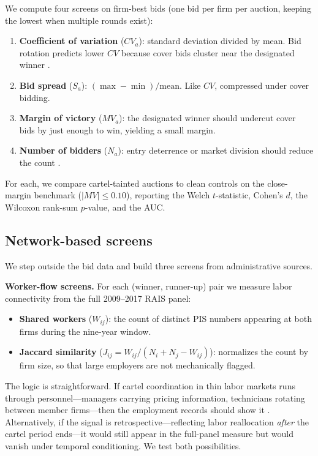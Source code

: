 We compute four screens on firm-best bids (one bid per firm per auction, keeping the lowest when multiple rounds exist):

\begin{enumerate}
\item \textbf{Coefficient of variation} ($CV_a$): standard deviation divided by mean. Bid rotation predicts lower $CV$ because cover bids cluster near the designated winner \citep{porter1993detecting, abrantesmetz2006variance}.

\item \textbf{Bid spread} ($S_a$): $(\max - \min)/\text{mean}$. Like $CV$, compressed under cover bidding.

\item \textbf{Margin of victory} ($MV_a$): the designated winner should undercut cover bids by just enough to win, yielding a small margin.

\item \textbf{Number of bidders} ($N_a$): entry deterrence or market division should reduce the count \citep{marshall2012economics}.
\end{enumerate}

For each, we compare cartel-tainted auctions to clean controls on the close-margin benchmark ($\lvert MV \rvert \le 0.10$), reporting the Welch $t$-statistic, Cohen's $d$, the Wilcoxon rank-sum $p$-value, and the AUC.

\subsection{Network-based screens}\label{sec:network}

We step outside the bid data and build three screens from administrative sources.

\noindent\textbf{Worker-flow screens.} For each (winner, runner-up) pair we measure labor connectivity from the full 2009--2017 RAIS panel:

\begin{itemize}
\item \textbf{Shared workers} ($W_{ij}$): the count of distinct PIS numbers appearing at both firms during the nine-year window.

\item \textbf{Jaccard similarity} ($J_{ij} = W_{ij} / (N_i + N_j - W_{ij})$): normalizes the count by firm size, so that large employers are not mechanically flagged.
\end{itemize}

The logic is straightforward. If cartel coordination in thin labor markets runs through personnel---managers carrying pricing information, technicians rotating between member firms---then the employment records should show it \citep{stoyanov2012worker, serafinelli2019good}. Alternatively, if the signal is retrospective---reflecting labor reallocation \emph{after} the cartel period ends---it would still appear in the full-panel measure but would vanish under temporal conditioning. We test both possibilities.

